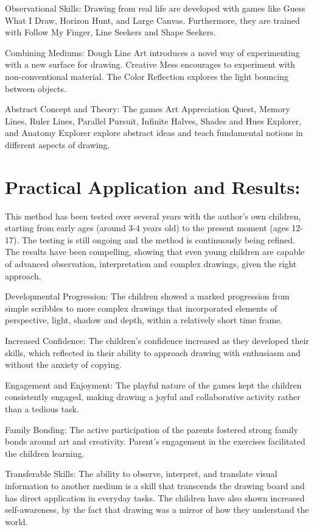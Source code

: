 \documentclass{article}
\begin{document}
Observational Skills: Drawing from real life are developed with games like Guess What I Draw, Horizon Hunt, and Large Canvas. Furthermore, they are trained with Follow My Finger, Line Seekers and Shape Seekers.

Combining Mediums: Dough Line Art introduces a novel way of experimenting with a new surface for drawing. Creative Mess encourages to experiment with non-conventional material. The Color Reflection explores the light bouncing between objects.

Abstract Concept and Theory: The games Art Appreciation Quest, Memory Lines, Ruler Lines, Parallel Pursuit, Infinite Halves, Shades and Hues Explorer, and Anatomy Explorer explore abstract ideas and teach fundamental notions in different aspects of drawing.



\section{Practical Application and Results:}

This method has been tested over several years with the author’s own children, starting from early ages (around 3-4 years old) to the present moment (ages 12-17). The testing is still ongoing and the method is continuously being refined. The results have been compelling, showing that even young children are capable of advanced observation, interpretation and complex drawings, given the right approach.

Developmental Progression: The children showed a marked progression from simple scribbles to more complex drawings that incorporated elements of perspective, light, shadow and depth, within a relatively short time frame.

Increased Confidence: The children’s confidence increased as they developed their skills, which reflected in their ability to approach drawing with enthusiasm and without the anxiety of copying.

Engagement and Enjoyment: The playful nature of the games kept the children consistently engaged, making drawing a joyful and collaborative activity rather than a tedious task.

Family Bonding: The active participation of the parents fostered strong family bonds around art and creativity. Parent’s engagement in the exercises facilitated the children learning.

Transferable Skills: The ability to observe, interpret, and translate visual information to another medium is a skill that transcends the drawing board and has direct application in everyday tasks. The children have also shown increased self-awareness, by the fact that drawing was a mirror of how they understand the world.
\end{document}
